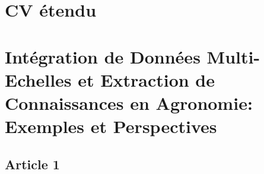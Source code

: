 \documentclass[
11pt, %
french, %
singlespacing, %
headsepline, %
]{MastersDoctoralThesis} %
\begin{document}


\mainmatter %

\pagestyle{thesis} %

\part{CV étendu} %
\label{cv} %

%


%
%
\part{Intégration de Données Multi-Echelles et Extraction de Connaissances en Agronomie: Exemples et Perspectives} %
\label{Perspectives}

% 
%
% 
% 


\printbibliography[heading=bibintoc]

%
%
%



\appendix %


\chapter{Article 1}

\end{document}
